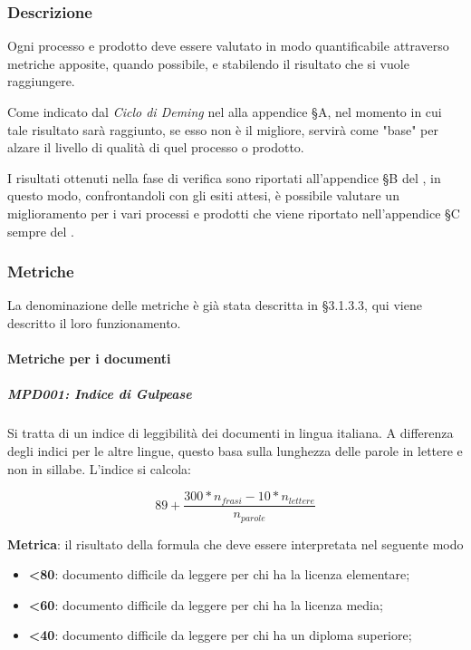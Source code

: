 
		\subsubsection{Descrizione}
		Ogni processo e prodotto deve essere valutato in modo quantificabile attraverso metriche apposite, quando possibile, e stabilendo il risultato che si vuole raggiungere.
		
		Come indicato dal \textit{Ciclo di Deming} nel \Doc{\PdQ} alla appendice §A, nel momento in cui tale risultato sarà raggiunto, se esso non è il migliore, servirà come "base" per alzare il livello di qualità di quel processo o prodotto.
		
		I risultati ottenuti nella fase di verifica sono riportati all'appendice §B del \Doc{\PdQ}, in questo modo, confrontandoli con gli esiti attesi, è possibile valutare un miglioramento per i vari processi e prodotti che viene riportato nell'appendice §C sempre del \PdQ. 

		\subsubsection{Metriche}
		La denominazione delle metriche è già stata descritta in §3.1.3.3, qui viene descritto il loro funzionamento.
			\paragraph{Metriche per i documenti}
				\subparagraph{MPD001: Indice di Gulpease}
				Si tratta di un indice di leggibilità dei documenti in lingua italiana. A differenza degli indici per le altre lingue, questo basa sulla lunghezza delle parole in lettere e non in sillabe. L'indice si calcola:
				
				\[89+\dfrac{300*n_{frasi}-10*n_{lettere}}{n_{parole}}\]
				
				\textbf{Metrica}: il risultato della formula che deve essere interpretata nel seguente modo
				
				\begin{itemize}
					\item \textbf{<80}: documento  difficile da leggere per chi ha la licenza elementare;
					\item \textbf{<60}: documento  difficile da leggere per chi ha la licenza media;
					\item \textbf{<40}: documento difficile da leggere per chi ha un diploma superiore;
				\end{itemize}
				
